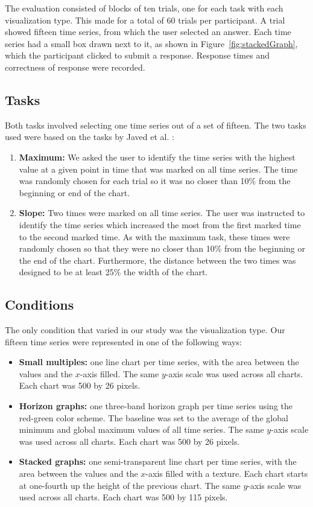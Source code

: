 \documentclass{article}
\begin{document}
The evaluation consisted of blocks of ten trials, one for each task with each visualization type.  This made for a total of 60 trials per participant.  A trial showed fifteen time series, from which the user selected an answer.  Each time series had a small box drawn next to it, as shown in Figure~\ref{fig:stackedGraph}, which the participant clicked to submit a response.  Response times and correctness of response were recorded.

\subsection{Tasks}

Both tasks involved selecting one time series out of a set of fifteen.  The two tasks used were based on the tasks by Javed et al. \cite{javed2010}:
\begin{enumerate}
\item \textbf{Maximum:} We asked the user to identify the time series with the highest value at a given point in time that was marked on all time series.  The time was randomly chosen for each trial so it was no closer than 10\% from the beginning or end of the chart.
\item \textbf{Slope:} Two times were marked on all time series.  The user was instructed to identify the time series which increased the most from the first marked time to the second marked time.  As with the maximum task, these times were randomly chosen so that they were no closer than 10\% from the beginning or the end of the chart.  Furthermore, the distance between the two times was designed to be at least 25\% the width of the chart.
\end{enumerate}

\subsection{Conditions}

The only condition that varied in our study was the visualization type.  Our fifteen time series were represented in one of the following ways:

\begin{itemize}
\item \textbf{Small multiples:} one line chart per time series, with the area between the values and the $x$-axis filled. The same $y$-axis scale was used across all charts.  Each chart was 500 by 26 pixels.
\item \textbf{Horizon graphs:} one three-band horizon graph per time series using the red-green color scheme.  The baseline was set to the average of the global minimum and global maximum values of all time series.  The same $y$-axis scale was used across all charts.  Each chart was 500 by 26 pixels.
\item \textbf{Stacked graphs:}  one semi-transparent line chart per time series, with the area between the values and the $x$-axis filled with a texture. Each chart starts at one-fourth up the height of the previous chart. The same $y$-axis scale was used across all charts.  Each chart was 500 by 115 pixels.
\end{itemize}
\end{document}
